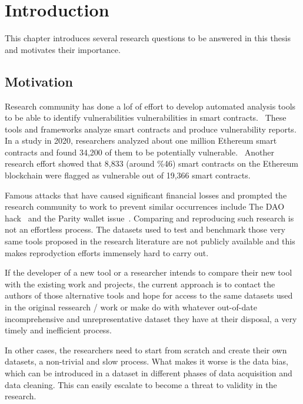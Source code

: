 \chapter{Introduction}

  This chapter introduces several research questions to be answered in this thesis and motivates their importance.

\section{Motivation}
  Research community has done a lof of effort to develop automated analysis tools~\cite{ref_tools} to be able to identify vulnerabilities vulnerabilities in smart contracts.~\cite{ref_tools}
  These tools and frameworks analyze smart contracts and produce vulnerability reports.
	In a study in 2020, researchers analyzed about one million Ethereum smart contracts and found 34,200 of them to be potentially vulnerable.~\cite{ref_flag1}
  Another research effort showed that 8,833 (around \%46) smart contracts on the Ethereum blockchain were flagged as vulnerable out of 19,366 smart contracts.~\cite{ref_flag2}

  Famous attacks that have caused significant financial losses and prompted the research community to work to prevent similar occurrences include The DAO hack~\cite{dao} and the Parity wallet issue~\cite{ref_parity}.
  Comparing and reproducing such research is not an effortless process.
	The datasets used to test and benchmark those very same tools proposed in the research literature are not publicly available and this makes reprodyction efforts immensely hard to carry out.

  If the developer of a new tool or a researcher intends to compare their new tool with the existing work and projects,
  the current approach is to contact the authors of those alternative tools and hope for access to the same datasets used in the original
  ressearch / work or make do with whatever out-of-date incomprehensive and unrepresentative dataset they have at their disposal, a very timely and inefficient process.~\cite{ref_flag2}

  In other cases, the researchers need to start from scratch and create their own datasets, a non-trivial and slow process.
  What makes it worse is the data bias, which can be introduced in a dataset in different phases of data acquisition and data cleaning.
  This can easily escalate to become a threat to validity in the research.~\cite{Empirical-Evaluation-of-Smart-Contract-Testing:What-is-the-Best-Choice}

